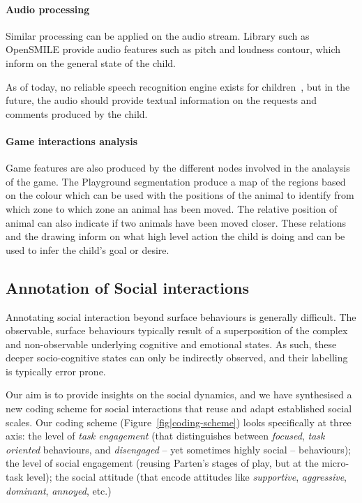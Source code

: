 \documentclass[sigconf]{acmart}
\begin{document}
\paragraph{Audio processing}

Similar processing can be applied on the audio stream. Library such as OpenSMILE
provide audio features such as pitch and loudness contour, which inform on the
general state of the child.

As of today, no reliable speech recognition engine exists for
children~\cite{kennedy2017child}, but in the future, the audio should provide
textual information on the requests and comments produced by the child.

\paragraph{Game interactions analysis}


Game features are also produced by the different nodes involved in the analaysis
of the game. The Playground segmentation produce a map of the regions based on
the colour which can be used with the positions of the animal to identify from
which zone to which zone an animal has been moved. The relative position of
animal can also indicate if two animals have been moved closer. These relations
and the drawing inform on what high level action the child is doing and can be
used to infer the child's goal or desire.

\subsection{Annotation of Social interactions}
\label{sec|coding-scheme}

Annotating social interaction beyond surface behaviours is generally difficult.
The observable, surface behaviours typically result of a superposition of the
complex and non-observable underlying cognitive and emotional states. As
such, these deeper socio-cognitive states can only be indirectly observed,
and their labelling is typically error prone.

Our aim is to provide insights on the social dynamics, and we have synthesised a
new coding scheme for social interactions that reuse and adapt established
social scales. Our coding scheme (Figure~\ref{fig|coding-scheme}) looks specifically
at three axis: the level of \emph{task engagement} (that distinguishes between
\emph{focused}, \emph{task oriented} behaviours, and \emph{disengaged} -- yet
sometimes highly social -- behaviours); the level of social engagement (reusing
Parten's stages of play, but at the micro-task level); the social attitude (that
encode attitudes like \emph{supportive}, \emph{aggressive}, \emph{dominant},
\emph{annoyed}, etc.)
\end{document}
